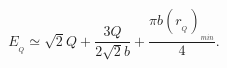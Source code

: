\begin{equation}
E_{_{Q}}\simeq \sqrt{2}Q+{\frac{3Q}{2\sqrt{2}b}}+\frac{\pi
b(r_{_{Q}})_{_{min}}}{4}.
\end{equation}

